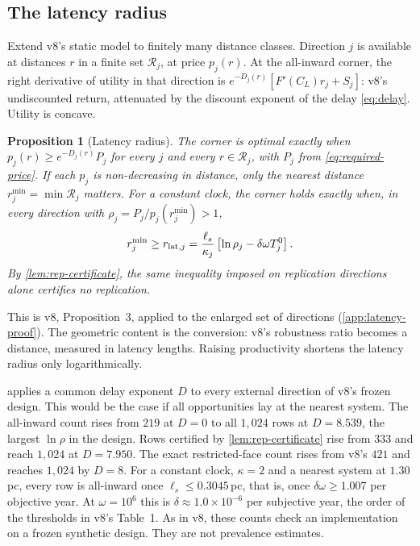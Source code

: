 \documentclass[11pt,a4paper]{article}
\newtheorem{proposition}{Proposition}
\theoremstyle{definition}
\newcommand{\ls}{\ell_s}
\begin{document}
\subsection{The latency radius}
Extend v8's static model to finitely many distance classes. Direction $j$ is
available at distances $r$ in a finite set $\mathcal R_j$, at price $p_j(r)$.
At the all-inward corner, the right derivative of utility in that direction is
$e^{-D_j(r)}[F'(C_L)r_j+S_j]$: v8's undiscounted return, attenuated by the
discount exponent of the delay \cref{eq:delay}. Utility is concave.

\begin{proposition}[Latency radius]
\label{prop:latency-radius}
The corner is optimal exactly when $p_j(r)\geq e^{-D_j(r)}P_j$ for every $j$
and every $r\in\mathcal R_j$, with $P_j$ from \cref{eq:required-price}. If each
$p_j$ is non-decreasing in distance, only the nearest distance
$r_j^{\min}=\min\mathcal R_j$ matters. For a constant clock, the corner holds
exactly when, in every direction with $\rho_j=P_j/p_j(r_j^{\min})>1$,
\begin{equation}
 r_j^{\min}\geq r_{{\rm lat},j}=\frac{\ls}{\kappa_j}
 \left[\ln\rho_j-\delta\omega T_j^0\right].
 \label{eq:latency-radius}
\end{equation}
By \cref{lem:rep-certificate}, the same inequality imposed on replication
directions alone certifies no replication.
\end{proposition}
\noindent This is v8, Proposition~3, applied to the enlarged set of directions
(\cref{app:latency-proof}). The geometric content is the conversion: v8's
robustness ratio becomes a distance, measured in latency lengths. Raising
productivity shortens the latency radius only logarithmically.

 applies a common delay exponent $D$ to every external
direction of v8's frozen design. This would be the case if all opportunities
lay at the nearest system. The all-inward count rises from $219$ at $D=0$ to
all $1{,}024$ rows at $D=8.539$, the largest $\ln\rho$ in the design. Rows
certified by \cref{lem:rep-certificate} rise from $333$ and reach $1{,}024$ at
$D=7.950$. The exact restricted-face count rises from v8's $421$ and reaches
$1{,}024$ by $D=8$. For a constant clock, $\kappa=2$ and a nearest system at
$1.30\,$pc, every row is all-inward once $\ls\leq0.3045\,$pc, that is, once
$\delta\omega\geq1.007$ per objective year. At $\omega=10^6$ this is
$\delta\approx1.0\times10^{-6}$ per subjective year, the order of the
thresholds in v8's Table~1. As in v8, these counts check an implementation on
a frozen synthetic design. They are not prevalence estimates.
\end{document}
